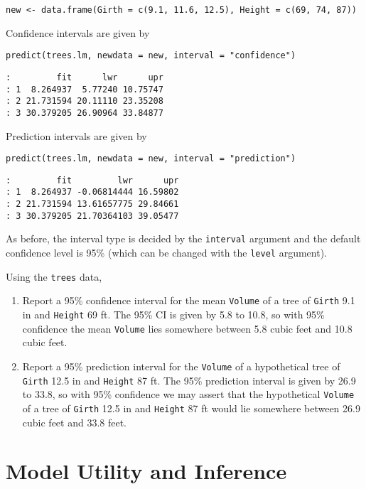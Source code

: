 \begin{verbatim}
new <- data.frame(Girth = c(9.1, 11.6, 12.5), Height = c(69, 74, 87))
\end{verbatim}

Confidence intervals are given by

\begin{verbatim}
predict(trees.lm, newdata = new, interval = "confidence")
\end{verbatim}

\begin{verbatim}
:         fit      lwr      upr
: 1  8.264937  5.77240 10.75747
: 2 21.731594 20.11110 23.35208
: 3 30.379205 26.90964 33.84877
\end{verbatim}

Prediction intervals are given by

\begin{verbatim}
predict(trees.lm, newdata = new, interval = "prediction")
\end{verbatim}

\begin{verbatim}
:         fit         lwr      upr
: 1  8.264937 -0.06814444 16.59802
: 2 21.731594 13.61657775 29.84661
: 3 30.379205 21.70364103 39.05477
\end{verbatim}

As before, the interval type is decided by the \texttt{interval} argument and
the default confidence level is 95\% (which can be changed with the
\texttt{level} argument).


Using the \texttt{trees} data, 

\begin{enumerate}
\item Report a 95\% confidence interval for the mean \texttt{Volume} of a tree of
\texttt{Girth} 9.1 in and \texttt{Height} 69 ft. The 95\% CI is given by
5.8 to 10.8, so with 95\%
confidence the mean \texttt{Volume} lies somewhere between
5.8 cubic feet and 10.8 cubic feet.
\item Report a 95\% prediction interval for the \texttt{Volume} of a hypothetical
tree of \texttt{Girth} 12.5 in and \texttt{Height} 87 ft. The 95\% prediction
interval is given by 26.9 to
33.8, so with 95\% confidence we may assert that
the hypothetical \texttt{Volume} of a tree of \texttt{Girth} 12.5 in and \texttt{Height}
87 ft would lie somewhere between 26.9
cubic feet and 33.8 feet.
\end{enumerate}

\section{Model Utility and Inference}
\label{sec-12-3}

